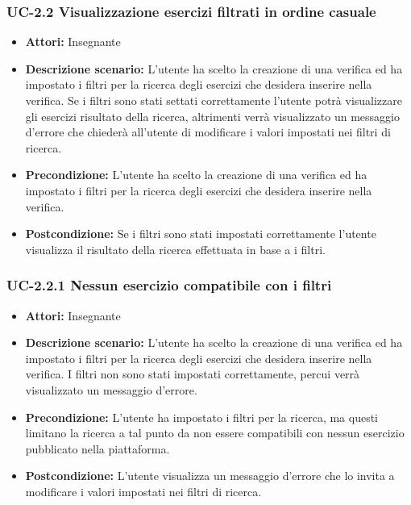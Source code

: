 \subsubsection{UC-2.2 Visualizzazione esercizi filtrati in ordine casuale}
\begin{itemize}
		\item \textbf{Attori: } Insegnante
		\item \textbf{Descrizione scenario: }L'utente ha scelto la creazione di una verifica ed ha impostato i filtri per la ricerca degli esercizi che desidera inserire nella verifica. Se i filtri sono stati settati correttamente l'utente potrà visualizzare gli esercizi risultato della ricerca, altrimenti verrà visualizzato un messaggio d'errore che chiederà all'utente di modificare i valori impostati nei filtri di ricerca.
		\item \textbf{Precondizione: }L'utente ha scelto la creazione di una verifica ed ha impostato i filtri per la ricerca degli esercizi che desidera inserire nella verifica.
		\item \textbf{Postcondizione: }Se i filtri sono stati impostati correttamente l'utente visualizza il risultato della ricerca effettuata in base a i filtri.
\end{itemize}
\subsubsection{UC-2.2.1 Nessun esercizio compatibile con i filtri}
\begin{itemize}
		\item \textbf{Attori: } Insegnante
		\item \textbf{Descrizione scenario: }L'utente ha scelto la creazione di una verifica ed ha impostato i filtri per la ricerca degli esercizi che desidera inserire nella verifica. I filtri non sono stati impostati correttamente, percui verrà visualizzato un messaggio d'errore.
		\item \textbf{Precondizione: }L'utente ha impostato i filtri per la ricerca, ma questi limitano la ricerca a tal punto da non essere compatibili con nessun esercizio pubblicato nella piattaforma.
		\item \textbf{Postcondizione: }L'utente visualizza un messaggio d'errore che lo invita a modificare i valori impostati nei filtri di ricerca.
\end{itemize}
